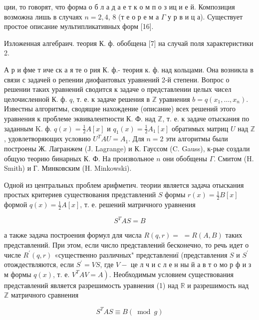 \documentclass[10pt]{article}
\begin{document}
ции, то говорят, что форма о б л а д а е т к о м п о з иц и е й. Композиция возможна лишь в случаях $n=2,4$, 8 (т е о р е м а $\Gamma$ у р в и ц а). Существует простое описание мультипликативных форм [16].



Изложенная алгебраич. теория К. ф. обобщена [7] на случай поля характеристики 2.



А р и фме т иче ск а я те о рия К. ф.- теория к. ф. над кольцами. Она возникла в связи с задачей о репении диофантовых уравнений 2-й степени. Вопрос о решении таких уравнений сводится к задаче о представлении целых чисел целочисленной К. ф. $q$, т. е. к задаче решения в $\mathbb{Z}$ уравнения $b=q\left(x_{1}, \ldots, x_{n}\right)$. Известны алгоритмы, сводящие нахождение (описание) всех решений этого уравнения к проблеме эквивалентности К. Ф. над $\mathbb{Z}$, т. е. к задаче отыскания по заданным K. ф. $q(x)=\frac{1}{2} A[x]$ и $q_{1}(x)=\frac{1}{2} A_{1}[x]$ обратимых матриц $U$ над $\mathbb{Z}$, удовлетворяющих условию $U^{T} A U=A_{1}$. Для $n=2$ эти алгоритмы были построены Ж. Лагранжем (J. Lagrange) и К. Гауссом (C. Gauss), к-рые создали общую теорию бинарных $К$. Ф. На произвольное $n$ они обобщены $\Gamma$. Смитом (H. Smith) и Г. Минковским (H. Minkowski).



Одной из центральных проблем арифметич. теории является задача отыскания простых критериев существования представлений $S$ формы $r(x)=\frac{1}{2} B[x]$ формой $q(x)=\frac{1}{2} A[x]$, т. е. решений матричного уравнения



\[

S^{T} A S=B

\]



а также задача построения формул для числа $R(q, r)=$ $=R(A, B)$ таких представлений. При этом, если число представлений бесконечно, то речь идет о числе $R^{\prime}(q, r)$ «существенно различных" представлениї (представления $S$ и $S^{\prime}$ отождествляются, если $S^{\prime}=V S$, где $V-$ це л ч и с л е н ны й а в т о мо р ф и з м формы $q(x)$, т. е. $\left.V^{T} A V=A\right)$. Необходимым условием существования представлений является разрешимость уравнения (1) над $\mathbb{R}$ и разрешимость над $\mathbb{Z}$ матричного сравнения



\[

S^{T} A S \equiv B(\bmod g)

\]
\end{document}
